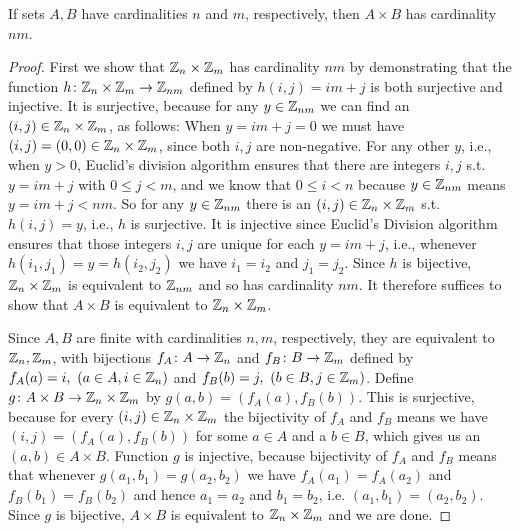 \setcounter{question}{33}  %
\begin{question}[Ewing]
  If sets $A,B$ have cardinalities $n$ and $m$, respectively, then $A\times B$ has cardinality $nm$.
\end{question}

\begin{proof}
 First we show that $\mathbb{Z}_n\times\mathbb{Z}_m$ has cardinality $nm$ by demonstrating that the function $h\colon \mathbb{Z}_n\times\mathbb{Z}_m\to\mathbb{Z}_{nm}$ defined by $h(i,j)=im+j$ is both surjective and injective. It is surjective, because for any $y\in\mathbb{Z}_{nm}$ we can find an $(i,j)\in\mathbb{Z}_n\times\mathbb{Z}_m$, as follows: When $y=im+j=0$ we must have $(i,j)=(0,0)\in\mathbb{Z}_n\times\mathbb{Z}_m$, since both $i,j$ are non-negative. For any other $y$, i.e., when $y>0$, Euclid's division algorithm ensures that there are integers $i,j$ s.t. $y=im+j$ with $0\le j<m$, and we know that $0\le i <n$ because $y\in\mathbb{Z}_{nm}$ means $y=im+j<nm$. So for any $y\in\mathbb{Z}_{nm}$ there is an $(i,j)\in\mathbb{Z}_n\times\mathbb{Z}_m$ s.t. $h(i,j)=y$, i.e., $h$ is surjective. It is injective since Euclid's Division algorithm ensures that those integers $i,j$ are unique for each $y=im+j$, i.e., whenever $h(i_1,j_1)=y=h(i_2,j_2)$ we have $i_1 = i_2$ and $j_1 = j_2$. Since $h$ is bijective, $\mathbb{Z}_n\times\mathbb{Z}_m$ is equivalent to $\mathbb{Z}_{nm}$ and so has cardinality $nm$. It therefore suffices to show that $A\times B$ is equivalent to $\mathbb{Z}_n\times\mathbb{Z}_m$.

Since $A,B$ are finite with cardinalities $n,m$, respectively, they are equivalent to $\mathbb{Z}_n,\mathbb{Z}_m$, with bijections $f_A\colon A\to\mathbb{Z}_n$ and $f_B\colon B\to\mathbb{Z}_m$ defined by $f_A(a)=i,\ (a\in A, i\in\mathbb{Z}_n)$ and $f_B(b)=j,\ (b\in B, j\in\mathbb{Z}_m)$. Define $g\colon A\times B\to\mathbb{Z}_n\times\mathbb{Z}_m$ by $g(a,b)=(f_A(a),f_B(b))$. This is surjective, because for every $(i,j)\in\mathbb{Z}_n\times\mathbb{Z}_m$ the bijectivity of $f_A$ and $f_B$ means we have $(i,j)=(f_A(a),f_B(b))$ for some $a\in A$ and a $b\in B$, which gives us an $(a,b)\in A\times B$. Function $g$ is injective, because bijectivity of $f_A$ and $f_B$ means that whenever $g(a_1,b_1)=g(a_2,b_2)$ we have $f_A(a_1)=f_A(a_2)$ and $f_B(b_1)=f_B(b_2)$ and hence $a_1=a_2$ and $b_1=b_2$, i.e. $(a_1, b_1)=(a_2,b_2)$. Since $g$ is bijective, $A\times B$ is equivalent to $\mathbb{Z}_n\times\mathbb{Z}_m$ and we are done.
\end{proof}

